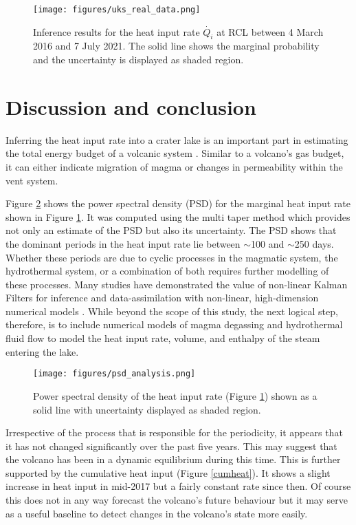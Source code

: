 \documentclass{bmc_template/bmcart}
\begin{document}
\begin{figure}
 	\texttt{[image: figures/uks\_real\_data.png]}  
 	\caption{Inference results for the heat input rate $\dot{Q_i}$ at RCL
             between 4 March 2016 and 7 July 2021. The solid line shows the
             marginal probability and the uncertainty is displayed as shaded
             region.}
\label{inference_result}
\end{figure}

\section{Discussion and conclusion}
Inferring the heat input rate into a crater lake is an important part in
estimating the total energy budget of a volcanic system \cite{Brown1989a}.
Similar to a volcano's gas budget, it can either indicate migration of magma or
changes in permeability within the vent system.

Figure \ref{psd} shows the power spectral density (PSD) for the marginal heat
input rate shown in Figure \ref{inference_result}. It was computed using the
multi taper method \cite{prietoComputersGeosciencesFortran2009} which provides
not only an estimate of the PSD but also its uncertainty. The PSD shows that the
dominant periods in the heat input rate lie between $\sim$100 and $\sim$250
days. Whether these periods are due to cyclic processes in the magmatic system,
the hydrothermal system, or a combination of both requires further modelling of
these processes. Many studies have demonstrated the value of non-linear Kalman
Filters for inference and data-assimilation with non-linear, high-dimension
numerical models \cite{White2018a}. While beyond the scope of this study, the
next logical step, therefore, is to include numerical models of magma degassing
and hydrothermal fluid flow to model the heat input rate, volume, and enthalpy
of the steam entering the lake.

\begin{figure}
    \texttt{[image: figures/psd\_analysis.png]}  
 	\caption{Power spectral density of the heat input rate 
             (Figure \ref{inference_result}) shown as a solid line
             with uncertainty displayed as shaded region.}
    \label{psd}
\end{figure}

Irrespective of the process that is responsible for the periodicity, it appears
that it has not changed significantly over the past five years. This may
suggest that the volcano has been in a dynamic equilibrium during this time.
This is further supported by the cumulative heat input (Figure \ref{cumheat}).
It shows a slight increase in heat input in mid-2017 but a fairly constant rate
since then. Of course this does not in any way forecast the volcano's future
behaviour but it may serve as a useful baseline to detect changes in the
volcano's state more easily.
\end{document}
